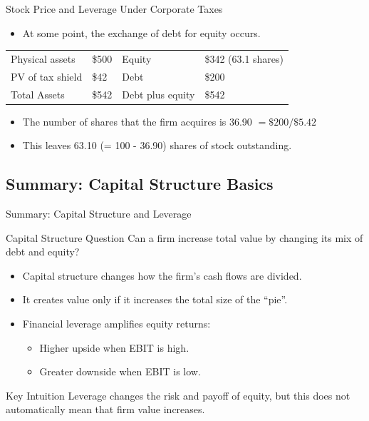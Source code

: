 \begin{frame}{Stock Price and Leverage Under Corporate Taxes}
	\begin{itemize}
		\item At some point, the exchange of debt for equity occurs. 
	\end{itemize}
	\begin{table}[]
		\centering
		\begin{tabular}{@{}llll@{}} \toprule
			Physical assets  & \$500 & Equity           & \$342 (63.1 shares) \\
			PV of tax shield & \$42  & Debt             & \$200               \\
			Total Assets     & \$542 & Debt plus equity & \$542  \\ \bottomrule
		\end{tabular}
	\end{table}
	\begin{itemize}
		\item The number of shares that the firm acquires is 36.90 $= \$200 / \$5.42$
		\item This leaves 63.10 (= 100 - 36.90) shares of stock outstanding.
	\end{itemize}
\end{frame}

\subsection*{Summary: Capital Structure Basics}
\begin{frame}{Summary: Capital Structure and Leverage}

\begin{block}{Capital Structure Question}
Can a firm increase total value by changing its mix of debt and equity?
\end{block}

\vspace{0.3cm}

\begin{itemize}
    \item Capital structure changes how the firm's cash flows are divided.
    \item It creates value only if it increases the total size of the ``pie''.
    \item Financial leverage amplifies equity returns:
    \begin{itemize}
        \item Higher upside when EBIT is high.
        \item Greater downside when EBIT is low.
    \end{itemize}
\end{itemize}

\vfill

\begin{alertblock}{Key Intuition}
Leverage changes the risk and payoff of equity, but this does not
automatically mean that firm value increases.
\end{alertblock}

\end{frame}

